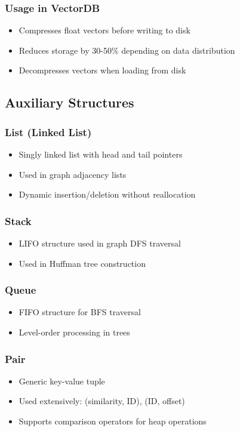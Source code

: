 \documentclass[12pt,a4paper]{article}
\begin{document}
\subsubsection{Usage in VectorDB}
\begin{itemize}
    \item Compresses float vectors before writing to disk
    \item Reduces storage by 30-50\% depending on data distribution
    \item Decompresses vectors when loading from disk
\end{itemize}

\subsection{Auxiliary Structures}

\subsubsection{List (Linked List)}
\begin{itemize}
    \item Singly linked list with head and tail pointers
    \item Used in graph adjacency lists
    \item Dynamic insertion/deletion without reallocation
\end{itemize}

\subsubsection{Stack}
\begin{itemize}
    \item LIFO structure used in graph DFS traversal
    \item Used in Huffman tree construction
\end{itemize}

\subsubsection{Queue}
\begin{itemize}
    \item FIFO structure for BFS traversal
    \item Level-order processing in trees
\end{itemize}

\subsubsection{Pair}
\begin{itemize}
    \item Generic key-value tuple
    \item Used extensively: (similarity, ID), (ID, offset)
    \item Supports comparison operators for heap operations
\end{itemize}
\end{document}
